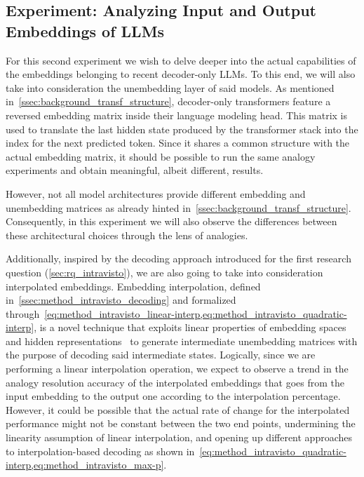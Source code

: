 \subsection{Experiment: Analyzing Input and Output \texorpdfstring{\linebreak}{} Embeddings of LLMs}\label{ssec:exp_emb_exp2}

For this second experiment we wish to delve deeper into the actual capabilities of the embeddings belonging to recent decoder-only LLMs.
To this end, we will also take into consideration the unembedding layer of said models.
As mentioned in~\cref{ssec:background_transf_structure}, decoder-only transformers feature a reversed embedding matrix inside their language modeling head.
This matrix is used to translate the last hidden state produced by the transformer stack into the index for the next predicted token.
Since it shares a common structure with the actual embedding matrix, it should be possible to run the same analogy experiments and obtain meaningful, albeit different, results.

However, not all model architectures provide different embedding and unembedding matrices as already hinted in~\cref{ssec:background_transf_structure}.
Consequently, in this experiment we will also observe the differences between these architectural choices through the lens of analogies.

Additionally, inspired by the decoding approach introduced for the first research question (\cref{sec:rq_intravisto}), we are also going to take into consideration interpolated embeddings.
Embedding interpolation, defined in~\cref{ssec:method_intravisto_decoding} and formalized through~\cref{eq:method_intravisto_linear-interp,eq:method_intravisto_quadratic-interp}, is a novel technique that exploits linear properties of embedding spaces and hidden representations~\cite{park2023, mikolov2013, drozd2016} to generate intermediate unembedding matrices with the purpose of decoding said intermediate states.
Logically, since we are performing a linear interpolation operation, we expect to observe a trend in the analogy resolution accuracy of the interpolated embeddings that goes from the input embedding to the output one according to the interpolation percentage.
However, it could be possible that the actual rate of change for the interpolated performance might not be constant between the two end points, undermining the linearity assumption of linear interpolation, and opening up different approaches to interpolation-based decoding as shown in~\cref{eq:method_intravisto_quadratic-interp,eq:method_intravisto_max-p}.


